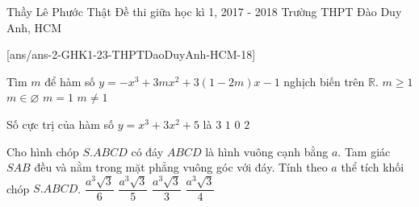 \begin{name}
{Thầy Lê Phước Thật}
{Đề thi giữa học kì 1, 2017 - 2018 Trường THPT Đào Duy Anh, HCM}
\end{name}
\setcounter{ex}{0}
[ans/ans-2-GHK1-23-THPTDaoDuyAnh-HCM-18]

\begin{ex}%
Tìm $m$ để hàm số $y=-x^3+3mx^2+3(1-2m)x-1$ nghịch biến trên $\mathbb{R}$.
\choice
{$m \geq 1$}
{$m \in \varnothing$}
{\True $m=1$}
{$m \neq 1$}
\end{ex}

\begin{ex}%
Số cực trị của hàm số $y=x^3+3x^2+5$ là
\choice
{$3$}
{$1$}
{$0$}
{\True $2$}
\end{ex}

\begin{ex}%
Cho hình chóp $S.ABCD$ có đáy $ABCD$ là hình vuông cạnh bằng $a$. Tam giác $SAB$ đều và nằm trong mặt phẳng vuông góc với đáy. Tính theo $a$ thể tích khối chóp $S.ABCD$.
\choice
{\True $\dfrac{a^3 \sqrt{3}}{6}$}
{$\dfrac{a^3 \sqrt{3}}{5}$}
{$\dfrac{a^3 \sqrt{3}}{3}$}
{$\dfrac{a^3 \sqrt{3}}{4}$}
\end{ex}

